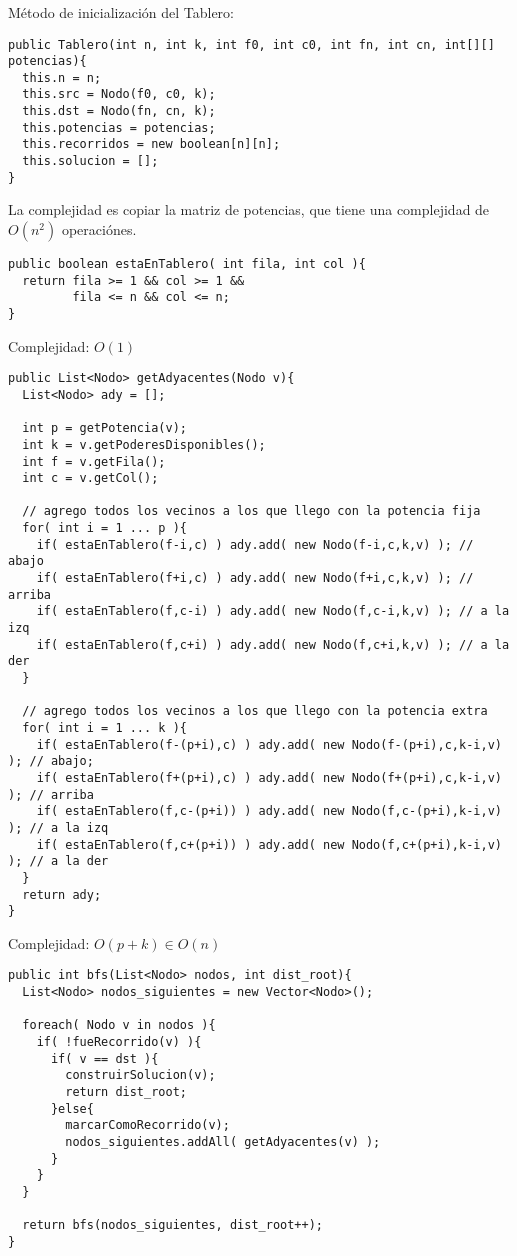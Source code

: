 \subsubsection{}

M\'etodo de inicializaci\'on del Tablero: 

\begin{verbatim}
public Tablero(int n, int k, int f0, int c0, int fn, int cn, int[][] potencias){
  this.n = n;
  this.src = Nodo(f0, c0, k);
  this.dst = Nodo(fn, cn, k);
  this.potencias = potencias;
  this.recorridos = new boolean[n][n];
  this.solucion = [];
}
\end{verbatim}

La complejidad es copiar la matriz de potencias, que tiene una complejidad de $O(n^2)$ operaci\'ones. 

\begin{verbatim}
public boolean estaEnTablero( int fila, int col ){
  return fila >= 1 && col >= 1 &&
         fila <= n && col <= n;
}
\end{verbatim}

Complejidad: $O(1)$


\begin{verbatim}
public List<Nodo> getAdyacentes(Nodo v){
  List<Nodo> ady = [];

  int p = getPotencia(v);
  int k = v.getPoderesDisponibles();
  int f = v.getFila();
  int c = v.getCol();

  // agrego todos los vecinos a los que llego con la potencia fija
  for( int i = 1 ... p ){
    if( estaEnTablero(f-i,c) ) ady.add( new Nodo(f-i,c,k,v) ); // abajo
    if( estaEnTablero(f+i,c) ) ady.add( new Nodo(f+i,c,k,v) ); // arriba
    if( estaEnTablero(f,c-i) ) ady.add( new Nodo(f,c-i,k,v) ); // a la izq
    if( estaEnTablero(f,c+i) ) ady.add( new Nodo(f,c+i,k,v) ); // a la der
  }

  // agrego todos los vecinos a los que llego con la potencia extra
  for( int i = 1 ... k ){
    if( estaEnTablero(f-(p+i),c) ) ady.add( new Nodo(f-(p+i),c,k-i,v) ); // abajo;
    if( estaEnTablero(f+(p+i),c) ) ady.add( new Nodo(f+(p+i),c,k-i,v) ); // arriba
    if( estaEnTablero(f,c-(p+i)) ) ady.add( new Nodo(f,c-(p+i),k-i,v) ); // a la izq
    if( estaEnTablero(f,c+(p+i)) ) ady.add( new Nodo(f,c+(p+i),k-i,v) ); // a la der
  }
  return ady;
}
\end{verbatim}

Complejidad: $O(p+k) \in O(n)$

\begin{verbatim}
public int bfs(List<Nodo> nodos, int dist_root){
  List<Nodo> nodos_siguientes = new Vector<Nodo>();

  foreach( Nodo v in nodos ){
    if( !fueRecorrido(v) ){
      if( v == dst ){
        construirSolucion(v);
        return dist_root;
      }else{
        marcarComoRecorrido(v);
        nodos_siguientes.addAll( getAdyacentes(v) );
      }
    }
  }

  return bfs(nodos_siguientes, dist_root++);
}
\end{verbatim}

